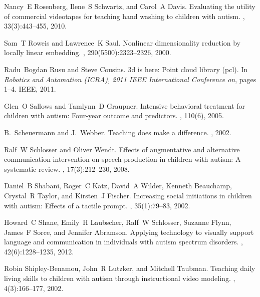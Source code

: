 \documentclass{ut-thesis}
\begin{document}
\begin{thebibliography}{100}
Nancy~E Rosenberg, Ilene~S Schwartz, and Carol~A Davis.
\newblock Evaluating the utility of commercial videotapes for teaching hand
  washing to children with autism.
, 33(3):443--455, 2010.

Sam~T Roweis and Lawrence~K Saul.
\newblock Nonlinear dimensionality reduction by locally linear embedding.
, 290(5500):2323--2326, 2000.

Radu~Bogdan Rusu and Steve Cousins.
\newblock 3d is here: Point cloud library (pcl).
\newblock In {\em Robotics and Automation (ICRA), 2011 IEEE International
  Conference on}, pages 1--4. IEEE, 2011.

Glen~O Sallows and Tamlynn~D Graupner.
\newblock Intensive behavioral treatment for children with autism: Four-year
  outcome and predictors.
, 110(6), 2005.

B.~Scheuermann and J.~Webber.
\newblock Teaching does make a difference.
, 2002.

Ralf~W Schlosser and Oliver Wendt.
\newblock Effects of augmentative and alternative communication intervention on
  speech production in children with autism: A systematic review.
, 17(3):212--230,
  2008.

Daniel~B Shabani, Roger~C Katz, David~A Wilder, Kenneth Beauchamp, Crystal~R
  Taylor, and Kirsten~J Fischer.
\newblock Increasing social initiations in children with autism: Effects of a
  tactile prompt.
, 35(1):79--83, 2002.

Howard~C Shane, Emily~H Laubscher, Ralf~W Schlosser, Suzanne Flynn, James~F
  Sorce, and Jennifer Abramson.
\newblock Applying technology to visually support language and communication in
  individuals with autism spectrum disorders.
,
  42(6):1228--1235, 2012.

Robin Shipley-Benamou, John~R Lutzker, and Mitchell Taubman.
\newblock Teaching daily living skills to children with autism through
  instructional video modeling.
, 4(3):166--177,
  2002.


\end{thebibliography}
\end{document}

